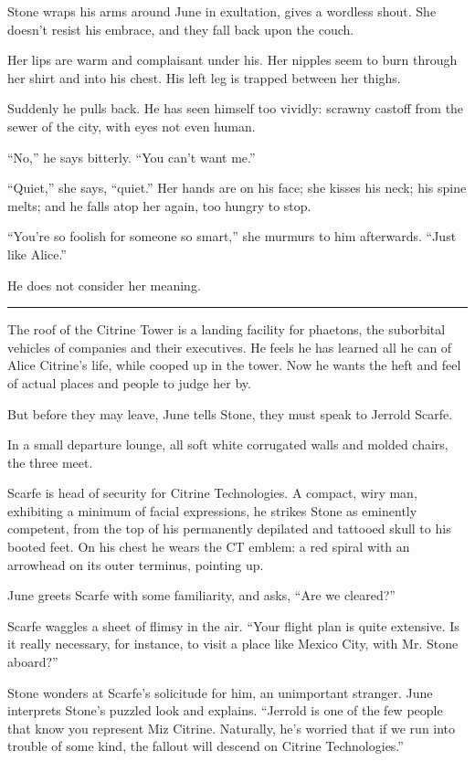 Stone wraps his arms around June in exultation, gives a wordless shout. She doesn't resist his embrace, and they fall back upon the couch.

Her lips are warm and complaisant under his. Her nipples seem to burn through her shirt and into his chest. His left leg is trapped between her thighs.

Suddenly he pulls back. He has seen himself too vividly: scrawny castoff from the sewer of the city, with eyes not even human.

``No,'' he says bitterly. ``You can't want me.''

``Quiet,'' she says, ``quiet.'' Her hands are on his face; she kisses his neck; his spine melts; and he falls atop her again, too hungry to stop.

``You're so foolish for someone so smart,'' she murmurs to him afterwards. ``Just like Alice.''

He does not consider her meaning.

\fancybreak{* * *}

The roof of the Citrine Tower is a landing facility for phaetons, the suborbital vehicles of companies and their executives. He feels he has learned all he can of Alice Citrine's life, while cooped up in the tower. Now he wants the heft and feel of actual places and people to judge her by.

But before they may leave, June tells Stone, they must speak to Jerrold Scarfe.

In a small departure lounge, all soft white corrugated walls and molded chairs, the three meet.

Scarfe is head of security for Citrine Technologies. A compact, wiry man, exhibiting a minimum of facial expressions, he strikes Stone as eminently competent, from the top of his permanently depilated and tattooed skull to his booted feet. On his chest he wears the CT emblem: a red spiral with an arrowhead on its outer terminus, pointing up.

June greets Scarfe with some familiarity, and asks, ``Are we cleared?''

Scarfe waggles a sheet of flimsy in the air. ``Your flight plan is quite extensive. Is it really necessary, for instance, to visit a place like Mexico City, with Mr. Stone aboard?''

Stone wonders at Scarfe's solicitude for him, an unimportant stranger. June interprets Stone's puzzled look and explains. ``Jerrold is one of the few people that know you represent Miz Citrine. Naturally, he's worried that if we run into trouble of some kind, the fallout will descend on Citrine Technologies.''

